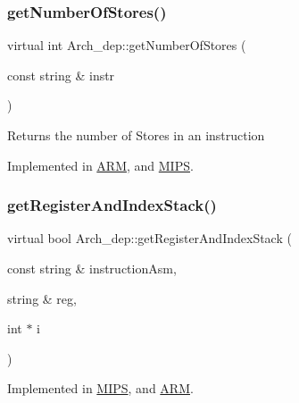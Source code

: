 \mbox{\label{classArch__dep_afd76af2d5947f461e8a04be6b45c2596}} 
\subsubsection{\texorpdfstring{get\+Number\+Of\+Stores()}{getNumberOfStores()}}
{\footnotesize\ttfamily virtual int Arch\+\_\+dep\+::get\+Number\+Of\+Stores (\begin{DoxyParamCaption}\item[{const string \&}]{instr }\end{DoxyParamCaption})\hspace{0.3cm}{\ttfamily [pure virtual]}}

Returns the number of Stores in an instruction 

Implemented in \hyperlink{classARM_a624c0346f9f963c9f42ae155c67e728f}{A\+RM}, and \hyperlink{classMIPS_a8555188088fbf6dba02c37ca43e036c6}{M\+I\+PS}.

\mbox{\label{classArch__dep_a449f2174ec019b4526e1904716d7bae1}} 
\subsubsection{\texorpdfstring{get\+Register\+And\+Index\+Stack()}{getRegisterAndIndexStack()}}
{\footnotesize\ttfamily virtual bool Arch\+\_\+dep\+::get\+Register\+And\+Index\+Stack (\begin{DoxyParamCaption}\item[{const string \&}]{instruction\+Asm,  }\item[{string \&}]{reg,  }\item[{int $\ast$}]{i }\end{DoxyParamCaption})\hspace{0.3cm}{\ttfamily [pure virtual]}}



Implemented in \hyperlink{classMIPS_a32b86b25f6547ba12fc2a8bc348b4aad}{M\+I\+PS}, and \hyperlink{classARM_a19df5de29d005c2629ea2e02f3312ccf}{A\+RM}.

